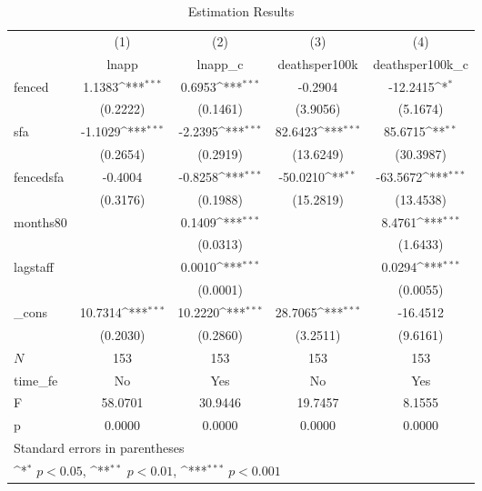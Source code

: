 \begin{table}[htbp]\centering
\def\sym#1{\ifmmode^{#1}\else\(^{#1}\)\fi}
\caption{Estimation Results}
\begin{tabular}{l*{4}{c}}
\hline\hline
            &\multicolumn{1}{c}{(1)}&\multicolumn{1}{c}{(2)}&\multicolumn{1}{c}{(3)}&\multicolumn{1}{c}{(4)}\\
            &\multicolumn{1}{c}{lnapp}&\multicolumn{1}{c}{lnapp\_c}&\multicolumn{1}{c}{deathsper100k}&\multicolumn{1}{c}{deathsper100k\_c}\\
\hline
fenced      &      1.1383\sym{***}&      0.6953\sym{***}&     -0.2904         &    -12.2415\sym{*}  \\
            &    (0.2222)         &    (0.1461)         &    (3.9056)         &    (5.1674)         \\
[1em]
sfa         &     -1.1029\sym{***}&     -2.2395\sym{***}&     82.6423\sym{***}&     85.6715\sym{**} \\
            &    (0.2654)         &    (0.2919)         &   (13.6249)         &   (30.3987)         \\
[1em]
fencedsfa   &     -0.4004         &     -0.8258\sym{***}&    -50.0210\sym{**} &    -63.5672\sym{***}\\
            &    (0.3176)         &    (0.1988)         &   (15.2819)         &   (13.4538)         \\
[1em]
months80    &                     &      0.1409\sym{***}&                     &      8.4761\sym{***}\\
            &                     &    (0.0313)         &                     &    (1.6433)         \\
[1em]
lagstaff    &                     &      0.0010\sym{***}&                     &      0.0294\sym{***}\\
            &                     &    (0.0001)         &                     &    (0.0055)         \\
[1em]
\_cons      &     10.7314\sym{***}&     10.2220\sym{***}&     28.7065\sym{***}&    -16.4512         \\
            &    (0.2030)         &    (0.2860)         &    (3.2511)         &    (9.6161)         \\
\hline
\(N\)       &         153         &         153         &         153         &         153         \\
time\_fe     &          No         &         Yes         &          No         &         Yes         \\
F           &     58.0701         &     30.9446         &     19.7457         &      8.1555         \\
p           &      0.0000         &      0.0000         &      0.0000         &      0.0000         \\
\hline\hline
\multicolumn{5}{l}{\footnotesize Standard errors in parentheses}\\
\multicolumn{5}{l}{\footnotesize \sym{*} \(p<0.05\), \sym{**} \(p<0.01\), \sym{***} \(p<0.001\)}\\
\end{tabular}
\end{table}
